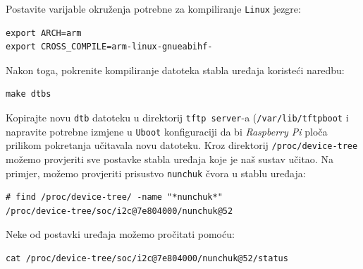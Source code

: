 \documentclass[11pt]{article}
\begin{document}
Postavite varijable okruženja potrebne za kompiliranje \texttt{Linux} jezgre:
\begin{lstlisting}
export ARCH=arm
export CROSS_COMPILE=arm-linux-gnueabihf-
\end{lstlisting}
Nakon toga, pokrenite kompiliranje datoteka stabla uređaja koristeći naredbu:
\begin{lstlisting}
make dtbs
\end{lstlisting}
Kopirajte novu \texttt{dtb} datoteku u direktorij \texttt{tftp server}-a
(\texttt{/var/lib/tftpboot} i napravite potrebne izmjene u \texttt{Uboot}
konfiguraciji da bi \textit{Raspberry Pi} ploča prilikom pokretanja učitavala
novu datoteku.
\newline
\newline
Kroz direktorij \texttt{/proc/device-tree} možemo provjeriti sve postavke
stabla uređaja koje je naš sustav učitao.
\newline
\newline
Na primjer, možemo provjeriti prisustvo \texttt{nunchuk} čvora u stablu uređaja:
\begin{lstlisting}
# find /proc/device-tree/ -name "*nunchuk*"
/proc/device-tree/soc/i2c@7e804000/nunchuk@52
\end{lstlisting}
Neke od postavki uređaja možemo pročitati pomoću:
\begin{lstlisting}
cat /proc/device-tree/soc/i2c@7e804000/nunchuk@52/status
\end{lstlisting}
\end{document}
